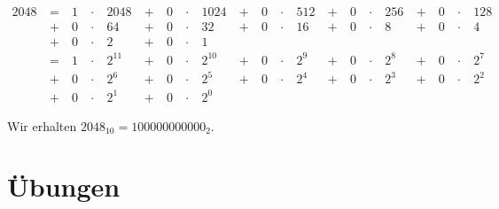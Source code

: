 \begin{example}

\begin{align*}
2048 & ~ = ~ & 1 & ~\cdot~ & 2048  & ~ + ~ & 0 & ~\cdot~ & 1024 & ~ + ~ & 0 & ~\cdot~ & 512 & ~ + ~ & 0 & ~\cdot~ & 256 & ~ + ~ & 0 & ~\cdot~ & 128 \\ 
& ~ + ~ & 0 & ~\cdot~ & 64 & ~ + ~ & 0 & ~\cdot~ & 32 & ~ + ~ & 0 & ~\cdot~ & 16 & ~ + ~ & 0 & ~\cdot~ & 8 & ~ + ~ & 0 & ~\cdot~ & 4 \\
& ~ + ~ & 0 & ~\cdot~ & 2 & ~ + ~ & 0 & ~\cdot~ & 1  \\
& ~ = ~ & 1 & ~\cdot~ & 2^{11}  & ~ + ~ & 0 & ~\cdot~ & 2^{10}  & ~ + ~ & 0 & ~\cdot~ & 2^9 & ~ + ~ & 0 & ~\cdot~ & 2^8 & ~ + ~ & 0 & ~\cdot~ & 2^7 \\ 
& ~ + ~ & 0 & ~\cdot~ & 2^6 & ~ + ~ & 0 & ~\cdot~ & 2^5 & ~ + ~ & 0 & ~\cdot~ & 2^4 & ~ + ~ & 0 & ~\cdot~ & 2^3 & ~ + ~ & 0 & ~\cdot~ & 2^2 \\ 
& ~ + ~ & 0 & ~\cdot~ & 2^1 & ~ + ~ & 0 & ~\cdot~ & 2^0
\end{align*}

Wir erhalten $2048_{10} = 100000000000_2$.

\end{example}

\newpage

\section{Übungen}

